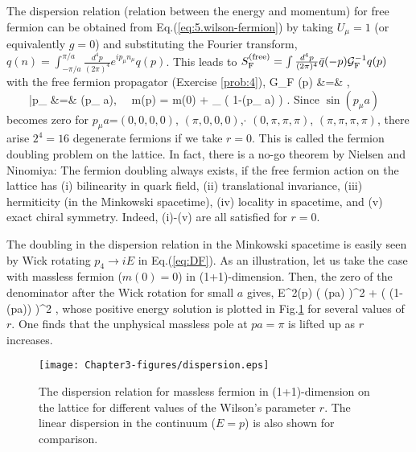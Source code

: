The dispersion relation (relation between the energy and momentum)
for free fermion can be obtained from Eq.(\ref{eq:5.wilson-fermion}) by taking $U_{\mu}=1$ (or equivalently $g=0$)
and substituting  the Fourier transform,
$q(n) = \int_{-\pi/a}^{\pi/a} \frac{d^4p}{(2\pi)^4} e^{i p_{\mu} n_{\mu}} q(p)$.
 This leads to $S_{\rm F}^{\rm (free)}= \int \frac{d^4p}{(2\pi)^4} \bar{q}(-p) {\cal G}_{\rm F}^{-1} q(p)$ with the
 free fermion propagator (Exercise  \ref{prob:4}),
 \beq
 \label{eq:DF}
 {\cal G}_{\rm F} (p) &=& ,  \\
 \label{eq:Mp}
 \ \ \ \ \bar{p}_{\mu} &=&  \sin (p_{\mu} a), \ \  m(p)  =  m(0) +   \sum_{\mu}      \left( 1-\cos (p_{\mu} a) \right)  .
 \eeq
Since $\sin (p_{\mu} a)$ becomes zero
 for $p_{\mu}a$=$(0,0,0,0)$, $(\pi, 0,0,0)$,$ \cdot $
  $(0,\pi,\pi,\pi)$, $(\pi,\pi,\pi,\pi)$, there arise
  $2^4 =16$ degenerate fermions  if we take  $r=0$.
 This is called the fermion doubling problem on the 
 lattice. In fact, there is a no-go theorem
 by  Nielsen and Ninomiya: 
 The  fermion doubling always exists, if the free fermion action  on the lattice
 has (i) bilinearity in quark field, 
  (ii) translational invariance,
   (iii) hermiticity (in the Minkowski spacetime),
    (iv) locality in spacetime, and (v) exact chiral symmetry.
Indeed, (i)-(v) are all satisfied for $r=0$.

The doubling in the dispersion relation in  the Minkowski spacetime is easily seen by Wick rotating 
$p_4 \rightarrow i E$ in Eq.(\ref{eq:DF}).  As an illustration, let us take the case with massless fermion ($m(0)=0$)
in (1+1)-dimension.  Then, the zero of the denominator after the Wick rotation for small $a$ gives,
\beq
E^2(p) \simeq \left(  \sin (pa) \right)^2 + \left(   (1-\cos(pa)) \right)^2 ,
\eeq
whose positive energy solution is plotted in Fig.\ref{fig:dispersion} for several values of $r$.
One finds that the unphysical massless pole at $pa=\pi$ is lifted up as $r$ increases.

\begin{figure}[t]
\begin{center}
\texttt{[image: Chapter3-figures/dispersion.eps]}
 \end{center}
\caption{The  dispersion relation for massless fermion in (1+1)-dimension on the lattice for different values of 
 the Wilson's parameter $r$.  The linear dispersion in the continuum ($E=p$) is also shown for comparison.}
\label{fig:dispersion}
\end{figure}
 
